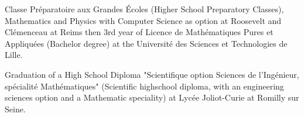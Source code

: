 \begin{rubric}{
}
\entry*[2005 - 2009]
Classe Préparatoire aux Grandes Écoles (Higher School Preparatory Classes), Mathematics and Physics with Computer Science as option at Roosevelt and Clémenceau at Reims then 3\textup{rd} year of Licence de Mathématiques Pures et Appliquées (Bachelor degree) at the Université des Sciences et Technologies de Lille.


\entry*[2005]
Graduation of a High School Diploma "Scientifique option Sciences de l'Ingénieur, spécialité Mathématiques" (Scientific highschool diploma, with an engineering sciences option and a Mathematic speciality) at Lycée Joliot-Curie at Romilly sur Seine.





\end{rubric}
